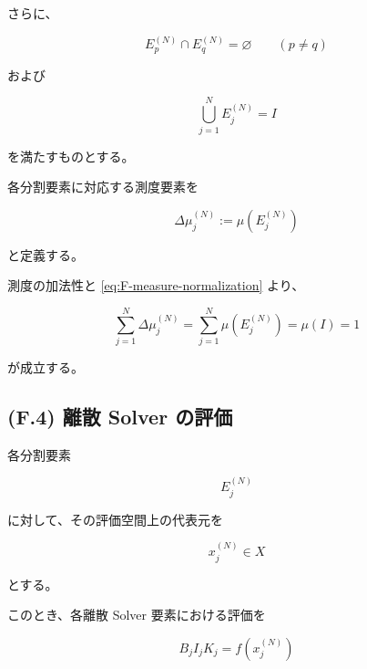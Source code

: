 \documentclass[a4paper,11pt]{article}
\begin{document}
さらに、

\begin{equation}
    E_p^{(N)}
    \cap
    E_q^{(N)}
    =
    \varnothing
    \qquad
    (p\neq q)
    \label{eq:F-disjoint}
\end{equation}

および

\begin{equation}
    \bigcup_{j=1}^{N}
    E_j^{(N)}
    =
    I
    \label{eq:F-cover}
\end{equation}

を満たすものとする。

各分割要素に対応する測度要素を

\begin{equation}
    \boxed{
        \Delta\mu_j^{(N)}
        :=
        \mu\!\left(E_j^{(N)}\right)
    }
    \label{eq:F-measure-element}
\end{equation}

と定義する。

測度の加法性と \eqref{eq:F-measure-normalization} より、

\begin{equation}
    \sum_{j=1}^{N}
    \Delta\mu_j^{(N)}
    =
    \sum_{j=1}^{N}
    \mu\!\left(E_j^{(N)}\right)
    =
    \mu(I)
    =
    1
    \label{eq:F-partition-normalization}
\end{equation}

が成立する。


\subsection{(F.4) 離散 Solver の評価}
\label{subsec:F4}

各分割要素

\begin{equation}
    E_j^{(N)}
\end{equation}

に対して、その評価空間上の代表元を

\begin{equation}
    x_j^{(N)}\in X
    \label{eq:F-representative}
\end{equation}

とする。

このとき、各離散 Solver 要素における評価を

\begin{equation}
    B_j I_j K_j
    =
    f\!\left(x_j^{(N)}\right)
    \label{eq:F-discrete-evaluation}
\end{equation}
\end{document}
